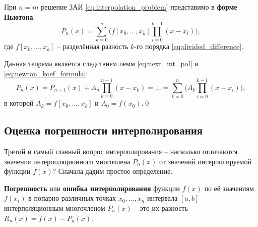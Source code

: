 \documentclass[../main.tex]{subfile}
\begin{document}
\begin{theorem}
	При $n=m$ решение ЗАИ \eqref{eq:interpolation_problem} представимо в
	\textbf{форме Ньютона}:
	\[\boxed{P_n(x)=\sum_{k=0}^{n}\big(f[x_0,...,x_k]\prod_{i=0}^{k-1}
	(x-x_i)\big)},\]
	где $f[x_0,...,x_k]$ -- разделённая разность $k$-го порядка
	\eqref{eq:divided_difference}.
\end{theorem}

\beginproof

	Данная теорема является следствием лемм \eqref{eq:next_int_pol} и
	\eqref{eq:newton_koef_formula}:
	\[P_n(x)=P_{n-1}(x)+A_n\prod_{k=0}^{n-1}(x-x_k)=...=
	\sum_{k=0}^{n}\big(A_k\prod_{i=0}^{k-1}(x-x_i)\big),\]
	в которой $A_k=f[x_0,...,x_k]$ и $A_0=f(x_0)$.\qed
\newpage

\subsection{Оценка погрешности интерполирования}
Третий и самый главный вопрос интерполирования -- насколько отличаются значения
интерполяционного многочлена $P_n(x)$ от значений интерполируемой функции $f(x)$?
Сначала дадим простое определение.

\begin{define}\label{eq:interpolation_error}
	\textbf{Погрешность} или \textbf{ошибка интерполирования} функции $f(x)$
	по её значениям $f(x_i)$ в попарно различных точках $x_0,...,x_n$
	интервала $[a,b]$ интерполяционным многочленом $P_n(x)$ -- это их
	разность $\boxed{R_n(x)=f(x)-P_n(x)}$.
\end{define}
\end{document}
